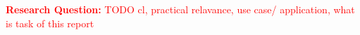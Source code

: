 \textcolor{red}{\textbf{Research Question:} TODO \acf{cl}, practical relavance, use case/ application, what is task of this report}
